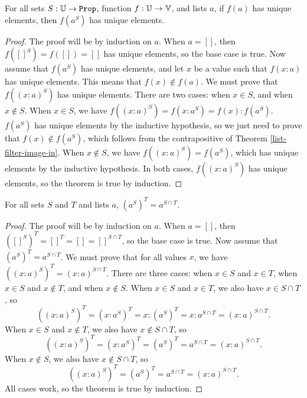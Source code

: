 \documentclass[../math.tex]{subfiles}
\begin{document}
\begin{theorem} \label{list-filter-image-unique}
    For all sets $S : \set{\U}$, function $f : \mathbb{U} \to \mathbb{V}$, and lists $a$, if
    $f(a)$ has unique elements, then $f(a^S)$ has unique elements.
\end{theorem}
\begin{proof}
    The proof will be by induction on $a$.  When $a = []$, then $f([]^S) = f([])
    = []$ has unique elements, so the base case is true.  Now assume that
    $f(a^S)$ has unique elements, and let $x$ be a value such that $f(x : a)$
    has unique elements.  This means that $f(x) \notin f(a)$.  We must prove
    that $f((x : a)^S)$ has unique elements.  There are two cases: when $x \in
    S$, and when $x \notin S$.  When $x \in S$, we have $f((x : a)^S) = f(x :
    a^S) = f(x) : f(a^S)$.  $f(a^S)$ has unique elements by the inductive
    hypothesis, so we just need to prove that $f(x) \notin f(a^S)$, which
    follows from the contrapositive of Theorem \ref{list-filter-image-in}.  When
    $x \notin S$, we have $f((x : a)^S) = f(a^S)$, which has unique elements by
    the inductive hypothesis.  In both cases, $f((x : a)^S)$ has unique
    elements, so the theorem is true by induction.
\end{proof}

\begin{theorem} \label{list-filter-inter}
    For all sets $S$ and $T$ and lists $a$, $(a^S)^T = a^{S \cap T}$.
\end{theorem}
\begin{proof}
    The proof will be by induction on $a$.  When $a = []$, then $([]^S)^T = []^T
    = [] = []^{S \cap T}$, so the base case is true.  Now assume that $(a^S)^T =
    a^{S \cap T}$.  We must prove that for all values $x$, we have $((x :
    a)^S)^T = (x : a)^{S \cap T}$.  There are three cases: when $x \in S$ and $x
    \in T$, when $x \in S$ and $x \notin T$, and when $x \notin S$.  When $x \in
    S$ and $x \in T$, we also have $x \in S \cap T$, so
    \[
        ((x : a)^S)^T = (x : a^S)^T = x : (a^S)^T = x : a^{S \cap T}
        = (x : a)^{S \cap T}.
    \]
    When $x \in S$ and $x \notin T$, we also have $x \notin S \cap T$, so
    \[
        ((x : a)^S)^T = (x : a^S)^T = (a^S)^T = a^{S \cap T}
        = (x : a)^{S \cap T}.
    \]
    When $x \notin S$, we also have $x \notin S \cap T$, so
    \[
        ((x : a)^S)^T = (a^S)^T = a^{S \cap T} = (x : a)^{S \cap T}.
    \]
    All cases work, so the theorem is true by induction.
\end{proof}
\end{document}
